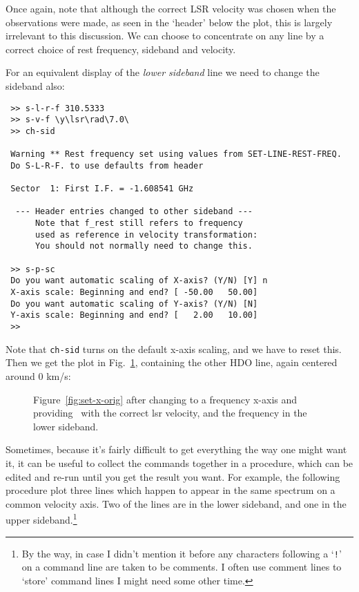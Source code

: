 Once again, note that although the correct LSR velocity was chosen
when the observations were made, as seen in the `header' below the
plot, this is largely irrelevant to this discussion. We can choose to
concentrate on any line by a correct choice of rest frequency,
sideband and velocity. 

For an equivalent display of the {\it lower sideband} line we need to
change the sideband also:
\begin{verbatim}
 >> s-l-r-f 310.5333 
 >> s-v-f \y\lsr\rad\7.0\
 >> ch-sid
 
 Warning ** Rest frequency set using values from SET-LINE-REST-FREQ.
 Do S-L-R-F. to use defaults from header
 
 Sector  1: First I.F. = -1.608541 GHz
 
  --- Header entries changed to other sideband ---
      Note that f_rest still refers to frequency  
      used as reference in velocity transformation:
      You should not normally need to change this.
 
 >> s-p-sc
 Do you want automatic scaling of X-axis? (Y/N) [Y] n
 X-axis scale: Beginning and end? [ -50.00   50.00] 
 Do you want automatic scaling of Y-axis? (Y/N) [N] 
 Y-axis scale: Beginning and end? [   2.00   10.00] 
 >> 
\end{verbatim} 


Note that {\tt ch-sid} turns on the default x-axis scaling, and we
have to reset this.  Then we get the plot in Fig.~\ref{fig:set-to-lsb},
containing the other HDO line, again centered around 0 km/s:

\begin{figure}[ht]
\begin{minipage}[t]{\textwidth}
\begin{minipage}[b]{0.5\textwidth}
\leavevmode
\centering
\epsfxsize=2.3in
\end{minipage}
\hfill
\begin{minipage}[b]{0.45\textwidth}
\caption[Part of the same in the LSB ]
{\small{Figure~\ref{fig:set-x-orig} after changing to a frequency
x-axis and providing \SPECX\ with the correct lsr velocity, and the 
frequency in the lower sideband.
\vspace*{1cm}
}}
\label{fig:set-to-lsb}
\end{minipage}
\end{minipage}
\end{figure}
   
Sometimes, because it's fairly difficult to get everything the way one
might want it, it can be useful to collect the commands together in a
procedure, which can be edited and re-run until you get the result you
want. For example, the following procedure plot three lines which
happen to appear in the same spectrum on a common velocity axis. Two
of the lines are in the lower sideband, and one in the upper
sideband.\footnote{By the way, in case I didn't mention it before
any characters following a `{\tt{!}}' on a command line are taken to be
comments. I often use comment lines to `store' command lines I might need
some other time.} 

